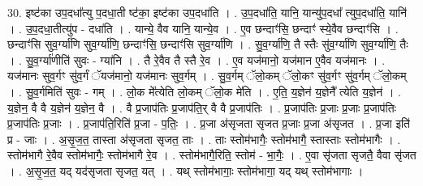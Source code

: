 \documentclass[17pt]{extarticle}
\begin{document}
30. इष्ट॑का उप॒दधा᳚त्यु प॒दधा॒ती ष्ट॑का॒ इष्ट॑का उप॒दधा॑ति । . उ॒प॒दधा॑ति॒ यानि॒ यान्यु॑प॒दधा᳚ त्युप॒दधा॑ति॒ यानि॑ । . उ॒प॒दधा॒तीत्यु॑प - दधा॑ति । . यान्ये॒ वैव यानि॒ यान्ये॒व । . ए॒व छन्दाꣳ॑सि॒ छन्दाꣳ॑ स्ये॒वैव छन्दाꣳ॑सि । . छन्दाꣳ॑सि सुव॒र्ग्या॑णि सुव॒र्ग्या॑णि॒ छन्दाꣳ॑सि॒ छन्दाꣳ॑सि सुव॒र्ग्या॑णि । . सु॒व॒र्ग्या॑णि॒ तै स्तैः सु॑व॒र्ग्या॑णि सुव॒र्ग्या॑णि॒ तैः । . सु॒व॒र्ग्या॑णीति॑ सुवः - ग्या॑नि । . तै रे॒वैव तै स्तै रे॒व । . ए॒व यज॑मानो॒ यज॑मान ए॒वैव यज॑मानः । . यज॑मानः सुव॒र्गꣳ सु॑व॒र्गं ॅयज॑मानो॒ यज॑मानः सुव॒र्गम् । . सु॒व॒र्गम् ॅलो॒कम् ॅलो॒कꣳ सु॑व॒र्गꣳ सु॑व॒र्गम् ॅलो॒कम् । . सु॒व॒र्गमिति॑ सुवः - गम् । . लो॒क मे᳚त्येति लो॒कम् ॅलो॒क मे॑ति । . ए॒ति॒ य॒ज्ञेन॑ य॒ज्ञेनै᳚ त्येति य॒ज्ञेन॑ । . य॒ज्ञेन॒ वै वै य॒ज्ञेन॑ य॒ज्ञेन॒ वै । . वै प्र॒जाप॑तिः प्र॒जाप॑ति॒र् वै वै प्र॒जाप॑तिः । . प्र॒जाप॑तिः प्र॒जाः प्र॒जाः प्र॒जाप॑तिः प्र॒जाप॑तिः प्र॒जाः । . प्र॒जाप॑ति॒रिति॑ प्र॒जा - प॒तिः॒ । . प्र॒जा अ॑सृजता सृजत प्र॒जाः प्र॒जा अ॑सृजत । . प्र॒जा इति॑ प्र - जाः । . अ॒सृ॒ज॒त॒ तास्ता अ॑सृजता सृजत॒ ताः । . ताः स्तोम॑भागैः॒ स्तोम॑भागै॒ स्तास्ताः स्तोम॑भागैः । . स्तोम॑भागै रे॒वैव स्तोम॑भागैः॒ स्तोम॑भागै रे॒व । . स्तोम॑भागै॒रिति॒ स्तोम॑ - भा॒गैः॒ । . ए॒वा सृ॑जता सृजतै॒ वैवा सृ॑जत । . अ॒सृ॒ज॒त॒ यद् यद॑सृजता सृजत॒ यत् । . यथ् स्तोम॑भागाः॒ स्तोम॑भागा॒ यद् यथ् स्तोम॑भागाः । \newline
\end{document}
